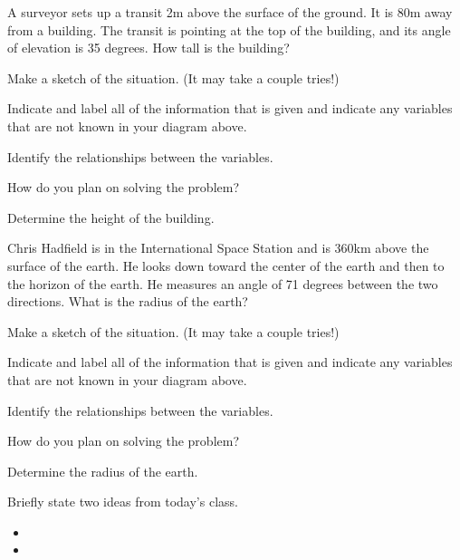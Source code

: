 \begin{problem}
\item A surveyor sets up a transit 2m above the surface of the
  ground. It is 80m away from a building. The transit is pointing at
  the top of the building, and its angle of elevation is 35
  degrees. How tall is the building?
  \begin{subproblem}
  \item Make a sketch of the situation. (It may take a couple tries!)
    \vfill
  \item Indicate and label all of the information that is given and
    indicate any variables that are not known in your diagram above.
  \item Identify the relationships between the variables.
    \vfill
    \vfill
  \item How do you plan on solving the problem?
    \vfill
  \item Determine the height of the building.
    \vfill
    \vfill
  \end{subproblem}

\clearpage

\item Chris Hadfield is in the International Space Station and is
  360km above the surface of the earth. He looks down toward the
  center of the earth and then to the horizon of the earth. He
  measures an angle of 71 degrees between the two directions. What is
  the radius of the earth?
  \begin{subproblem}
  \item Make a sketch of the situation. (It may take a couple tries!)
    \vfill
  \item Indicate and label all of the information that is given and
    indicate any variables that are not known in your diagram above.
  \item Identify the relationships between the variables.
    \vfill
    \vfill
  \item How do you plan on solving the problem?
    \vfill
  \item Determine the radius of the earth.
    \vfill
    \vfill
  \end{subproblem}

\end{problem}

\postClass

\begin{problem}
\item Briefly state two ideas from today's class.
  \begin{itemize}
  \item 
  \item 
  \end{itemize}
\item 
  \begin{subproblem}
    \item
  \end{subproblem}
\end{problem}



